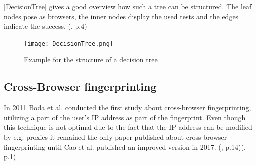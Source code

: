 \autoref{DecisionTree} gives a good overview how such a tree can be structured. The leaf nodes pose as browsers, the inner nodes display the used tests and the edges indicate the success. (\textcite{mulazzani13}, p.4)
\begin{figure}[H]
	\centering
	\texttt{[image: DecisionTree.png]}
	\caption{Example for the structure of a decision tree}
	\label{DecisionTree}
\end{figure}

\subsection{Cross-Browser fingerprinting}
In 2011 Boda et al. conducted the first study about cross-browser fingerprinting, utilizing a part of the user's IP address as part of the fingerprint. Even though this technique is not optimal due to the fact that the IP address can be modified by e.g. proxies it remained the only paper published about cross-browser fingerprinting until Cao et al. published an improved version in 2017. (\textcite{boda11}, p.14)(\textcite{Cao17}, p.1)

